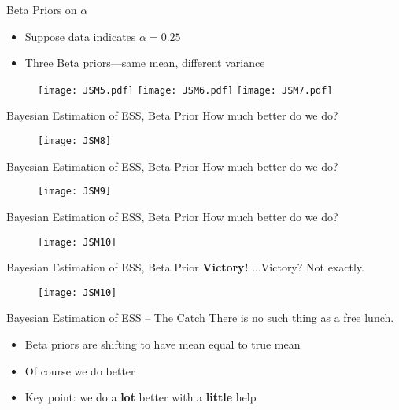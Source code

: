 \documentclass{beamer}
\begin{document}
\begin{frame}{Beta Priors on \huge{$\alpha$}}  %

\begin{itemize}
\item Suppose data indicates $\alpha = 0.25$
\item Three Beta priors---same mean, different variance
\end{itemize}

\begin{figure}
\texttt{[image: JSM5.pdf]}
\texttt{[image: JSM6.pdf]}
\texttt{[image: JSM7.pdf]}
\end{figure}

\end{frame}


\begin{frame}{Bayesian Estimation of ESS, Beta Prior}
How much better do we do?
\begin{figure}
\texttt{[image: JSM8]}
\end{figure}

\end{frame}

\begin{frame}{Bayesian Estimation of ESS, Beta Prior}
How much better do we do?
\begin{figure}
\texttt{[image: JSM9]}
\end{figure}

\end{frame}

\begin{frame}{Bayesian Estimation of ESS, Beta Prior}
How much better do we do?
\begin{figure}
\texttt{[image: JSM10]}
\end{figure}

\end{frame}


\begin{frame}{Bayesian Estimation of ESS, Beta Prior}{}
{\bf Victory!} ...Victory? Not exactly.
\begin{figure}
\texttt{[image: JSM10]}
\end{figure}

\end{frame}

\begin{frame}{Bayesian Estimation of ESS -- The Catch}{}
There is no such thing as a free lunch.

\begin{itemize}
\item Beta priors are shifting to have mean equal to true mean
\item Of course we do better
\item Key point: we do a {\bf lot} better with a {\bf little} help
\end{itemize}

\end{frame}
\end{document}
